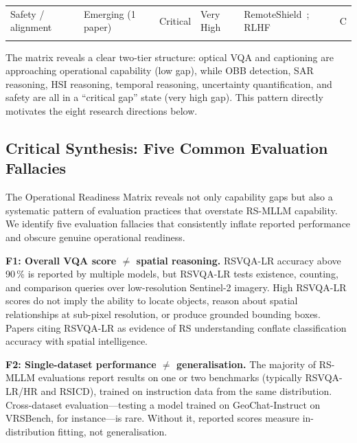 \begin{table}[t]
\begin{tabular*}{\textwidth}{@{\extracolsep\fill}p{2.4cm}p{2.6cm}p{2.8cm}p{1.6cm}p{3.2cm}p{0.7cm}}
Safety / alignment   & Emerging (1 paper)             & Critical                & Very High   & RemoteShield~\cite{remoteshield2026}; RLHF~\cite{rlhfrs2025}         & C \\
\botrule
\end{tabular*}
\end{table}

The matrix reveals a clear two-tier structure: optical VQA and captioning
are approaching operational capability (low gap), while OBB detection, SAR
reasoning, HSI reasoning, temporal reasoning, uncertainty quantification,
and safety are all in a ``critical gap'' state (very high gap). This
pattern directly motivates the eight research directions below.

\subsection{Critical Synthesis: Five Common Evaluation Fallacies}\label{sec9:fallacies}

The Operational Readiness Matrix reveals not only capability gaps but also
a systematic pattern of evaluation practices that overstate RS-MLLM capability.
We identify five evaluation fallacies that consistently inflate reported performance
and obscure genuine operational readiness.

\textbf{F1: Overall VQA score $\neq$ spatial reasoning.}
RSVQA-LR accuracy above 90\,\% is reported by multiple models, but RSVQA-LR
tests existence, counting, and comparison queries over low-resolution Sentinel-2
imagery. High RSVQA-LR scores do not imply the ability to locate objects, reason
about spatial relationships at sub-pixel resolution, or produce grounded bounding
boxes. Papers citing RSVQA-LR as evidence of RS understanding conflate
classification accuracy with spatial intelligence.

\textbf{F2: Single-dataset performance $\neq$ generalisation.}
The majority of RS-MLLM evaluations report results on one or two benchmarks
(typically RSVQA-LR/HR and RSICD), trained on instruction data from the same
distribution. Cross-dataset evaluation---testing a model trained on GeoChat-Instruct
on VRSBench, for instance---is rare. Without it, reported scores measure
in-distribution fitting, not generalisation.


